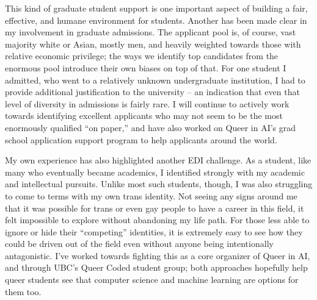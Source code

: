 \documentclass[12pt]{article}
\begin{document}
This kind of graduate student support is one important aspect of building a fair, effective, and humane environment for students. Another has been made clear in my involvement in graduate admissions. The applicant pool is, of course, vast majority white or Asian, mostly men, and heavily weighted towards those with relative economic privilege; the ways we identify top candidates from the enormous pool introduce their own biases on top of that. For one student I admitted, who went to a relatively unknown undergraduate institution, I had to provide additional justification to the university -- an indication that even that level of diversity in admissions is fairly rare. I will continue to actively work towards identifying excellent applicants who may not seem to be the most enormously qualified ``on paper,''
and have also worked on Queer in AI's grad school application support program to help applicants around the world.

My own experience has also highlighted another EDI challenge.
As a student, like many who eventually became academics, I identified strongly with my academic and intellectual pursuits.
Unlike most such students, though, I was also struggling to come to terms with my own trans identity.
Not seeing any signs around me that it was possible for trans or even gay people to have a career in this field, it felt impossible to explore without abandoning my life path.
For those less able to ignore or hide their ``competing'' identities, it is extremely easy to see how they could be driven out of the field even without anyone being intentionally antagonistic.
I've worked towards fighting this as a core organizer of Queer in AI, and through UBC's Queer Coded student group; both approaches hopefully help queer students see that computer science and machine learning are options for them too.
\end{document}
